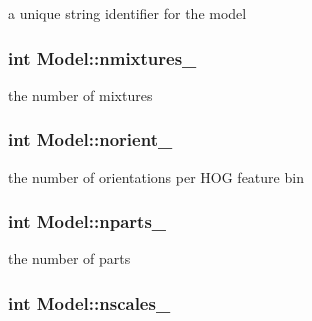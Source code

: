 a unique string identifier for the model 

\hypertarget{classModel_a047a8d7591bde166f0c3ab36a2130b53}{
\subsubsection[{nmixtures\-\_\-}]{\setlength{\rightskip}{0pt plus 5cm}int {\bf \-Model\-::nmixtures\-\_\-}}}\label{classModel_a047a8d7591bde166f0c3ab36a2130b53}


the number of mixtures 

\hypertarget{classModel_a40c5597450f8efb960bb7da74890e73c}{
\subsubsection[{norient\-\_\-}]{\setlength{\rightskip}{0pt plus 5cm}int {\bf \-Model\-::norient\-\_\-}}}\label{classModel_a40c5597450f8efb960bb7da74890e73c}


the number of orientations per \-H\-O\-G feature bin 

\hypertarget{classModel_ae8b3d33dbc43d6ab07c1553c9a1bbc2e}{
\subsubsection[{nparts\-\_\-}]{\setlength{\rightskip}{0pt plus 5cm}int {\bf \-Model\-::nparts\-\_\-}}}\label{classModel_ae8b3d33dbc43d6ab07c1553c9a1bbc2e}


the number of parts 

\hypertarget{classModel_ab711641b36aa9b8b578acf151af55aa7}{
\subsubsection[{nscales\-\_\-}]{\setlength{\rightskip}{0pt plus 5cm}int {\bf \-Model\-::nscales\-\_\-}}}\label{classModel_ab711641b36aa9b8b578acf151af55aa7}


